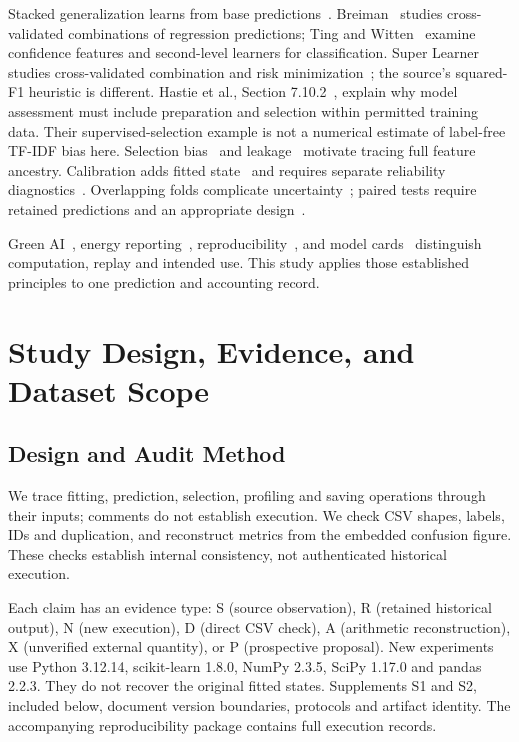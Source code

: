 \documentclass[doublecolumn]{ijcvsplatex}
\begin{document}
Stacked generalization learns from base predictions~\cite{wolpert1992stacked}. Breiman~\cite{breiman1996stacked} studies cross-validated combinations of regression predictions; Ting and Witten~\cite{ting1999issues} examine confidence features and second-level learners for classification. Super Learner studies cross-validated combination and risk minimization~\cite{vanderlaan2007super}; the source's squared-F1 heuristic is different. Hastie et al., Section 7.10.2~\cite{hastie2009elements}, explain why model assessment must include preparation and selection within permitted training data. Their supervised-selection example is not a numerical estimate of label-free TF-IDF bias here. Selection bias~\cite{varma2006bias,cawley2010overfitting} and leakage~\cite{kaufman2012leakage,kapoor2023leakage} motivate tracing full feature ancestry. Calibration adds fitted state~\cite{niculescumizil2005probabilities} and requires separate reliability diagnostics~\cite{vaicenavicius2019calibration}. Overlapping folds complicate uncertainty~\cite{bengio2004variance}; paired tests require retained predictions and an appropriate design~\cite{dror2018significance}.

Green AI~\cite{schwartz2020greenai}, energy reporting~\cite{henderson2020systematic}, reproducibility~\cite{pineau2021reproducibility}, and model cards~\cite{mitchell2019modelcards} distinguish computation, replay and intended use. This study applies those established principles to one prediction and accounting record.

\section{Study Design, Evidence, and Dataset Scope}
\label{sec:design}

\subsection{Design and Audit Method}
We trace fitting, prediction, selection, profiling and saving operations through their inputs; comments do not establish execution. We check CSV shapes, labels, IDs and duplication, and reconstruct metrics from the embedded confusion figure. These checks establish internal consistency, not authenticated historical execution.

Each claim has an evidence type: S (source observation), R (retained historical output), N (new execution), D (direct CSV check), A (arithmetic reconstruction), X (unverified external quantity), or P (prospective proposal). New experiments use Python 3.12.14, scikit-learn 1.8.0, NumPy 2.3.5, SciPy 1.17.0 and pandas 2.2.3. They do not recover the original fitted states. Supplements S1 and S2, included below, document version boundaries, protocols and artifact identity. The accompanying reproducibility package contains full execution records.
\end{document}
